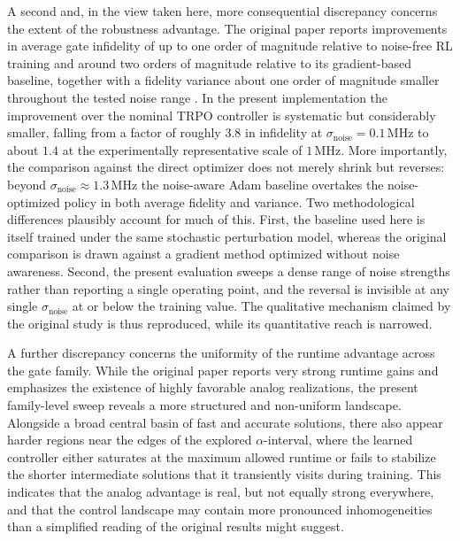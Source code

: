 A second and, in the view taken here, more consequential discrepancy concerns the extent of the robustness advantage. The original paper reports improvements in average gate infidelity of up to one order of magnitude relative to noise-free RL training and around two orders of magnitude relative to its gradient-based baseline, together with a fidelity variance about one order of magnitude smaller throughout the tested noise range \cite{Niu2019}. In the present implementation the improvement over the nominal TRPO controller is systematic but considerably smaller, falling from a factor of roughly \(3.8\) in infidelity at \(\sigma_{\mathrm{noise}}=0.1\,\mathrm{MHz}\) to about \(1.4\) at the experimentally representative scale of \(1\,\mathrm{MHz}\). More importantly, the comparison against the direct optimizer does not merely shrink but reverses: beyond \(\sigma_{\mathrm{noise}}\approx1.3\,\mathrm{MHz}\) the noise-aware Adam baseline overtakes the noise-optimized policy in both average fidelity and variance. Two methodological differences plausibly account for much of this. First, the baseline used here is itself trained under the same stochastic perturbation model, whereas the original comparison is drawn against a gradient method optimized without noise awareness. Second, the present evaluation sweeps a dense range of noise strengths rather than reporting a single operating point, and the reversal is invisible at any single \(\sigma_{\mathrm{noise}}\) at or below the training value. The qualitative mechanism claimed by the original study is thus reproduced, while its quantitative reach is narrowed.

A further discrepancy concerns the uniformity of the runtime advantage across the gate family. While the original paper reports very strong runtime gains and emphasizes the existence of highly favorable analog realizations, the present family-level sweep reveals a more structured and non-uniform landscape. Alongside a broad central basin of fast and accurate solutions, there also appear harder regions near the edges of the explored \(\alpha\)-interval, where the learned controller either saturates at the maximum allowed runtime or fails to stabilize the shorter intermediate solutions that it transiently visits during training. This indicates that the analog advantage is real, but not equally strong everywhere, and that the control landscape may contain more pronounced inhomogeneities than a simplified reading of the original results might suggest.

